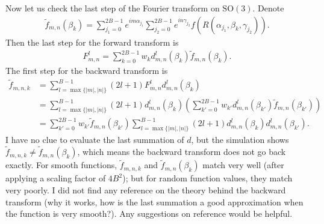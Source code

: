 \documentclass[10pt]{article}
\newcommand{\SO}{\ensuremath{\mathrm{SO}(3)}}
\begin{document}
Now let us check the last step of the Fourier transform on $\SO$.
Denote
\begin{align*}
	\tilde{f}_{m,n}(\beta_k) = \sum_{j_1=0}^{2B-1} e^{im\alpha_{j_1}} \sum_{j_2=0}^{2B-1} e^{in\gamma_{j_2}} f(R(\alpha_{j_1},\beta_k,\gamma_{j_2})).
\end{align*}
Then the last step for the forward transform is
\begin{align*}
	F_{m,n}^l = \sum_{k=0}^{2B-1} w_k d_{m,n}^l(\beta_k) \tilde{f}_{m,n}(\beta_k).
\end{align*}
The first step for the backward transform is
\begin{align*}
	\tilde{f}_{m,n,k} &= \sum_{l=\max\{|m|,|n|\}}^{B-1} (2l+1) F_{m,n}^l d_{m,n}^l(\beta_k) \\
	&= \sum_{l=\max\{|m|,|n|\}}^{B-1} (2l+1) d_{m,n}^l(\beta_k) \left( \sum_{k'=0}^{2B-1} w_{k'} d_{m,n}^l(\beta_{k'}) \tilde{f}_{m,n}(\beta_{k'}) \right) \\
	&= \sum_{k'=0}^{2B-1} w_{k'} \tilde{f}_{m,n}(\beta_{k'}) \sum_{l=\max\{|m|,|n|\}}^{B-1} (2l+1) d_{m,n}^l(\beta_k) d_{m,n}^l(\beta_{k'}).
\end{align*}
I have no clue to evaluate the last summation of $d$, but the simulation shows $\tilde{f}_{m,n,k} \neq \tilde{f}_{m,n}(\beta_k)$, which means the backward transform does not go back exactly.
For smooth functions, $\tilde{f}_{m,n,k}$ and $\tilde{f}_{m,n}(\beta_k)$ match very well (after applying a scaling factor of $4B^2$); but for random function values, they match very poorly.
I did not find any reference on the theory behind the backward transform (why it works, how is the last summation a good approximation when the function is very smooth?).
Any suggestions on reference would be helpful.
\end{document}
